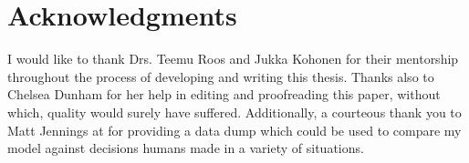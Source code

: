 
\section*{Acknowledgments}
\label{sec:thanks}


%
I would %
like to thank Drs. Teemu Roos
and Jukka Kohonen
for %
their mentorship throughout the
process of developing and writing this thesis.
%
Thanks also to Chelsea Dunham for her help in editing and proofreading
this paper,
without which,
quality would surely have suffered.
%
Additionally,
a courteous thank you to Matt Jennings at
 for providing a data dump
which could be used to compare my model against decisions humans made
in a variety of situations.
%


\newpage
